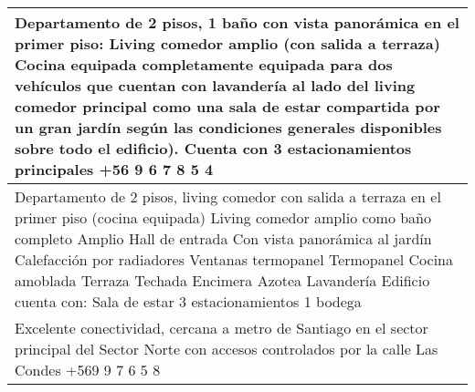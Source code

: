 \begin{table}[H]
\begin{tabular}{|m{45em}|}
\hline Departamento de 2 pisos, 1 baño con vista panorámica en el primer piso: Living comedor amplio (con salida a terraza) Cocina equipada completamente equipada para dos vehículos que cuentan con lavandería al lado del living comedor principal como una sala de estar compartida por un gran jardín según las condiciones generales disponibles sobre todo el edificio). Cuenta con 3 estacionamientos principales +56 9 6 7 8 5 4 \\
\hline Departamento de 2 pisos, living comedor con salida a terraza en el primer piso (cocina equipada) Living comedor amplio como baño completo Amplio Hall de entrada Con vista panorámica al jardín Calefacción por radiadores Ventanas termopanel Termopanel Cocina amoblada Terraza Techada Encimera Azotea Lavandería Edificio cuenta con: Sala de estar 3 estacionamientos 1 bodega \\
\hline Excelente conectividad, cercana a metro de Santiago en el sector principal del Sector Norte con accesos controlados por la calle Las Condes +569 9 7 6 5 8 \\
\hline
\end{tabular}
\end{table}
